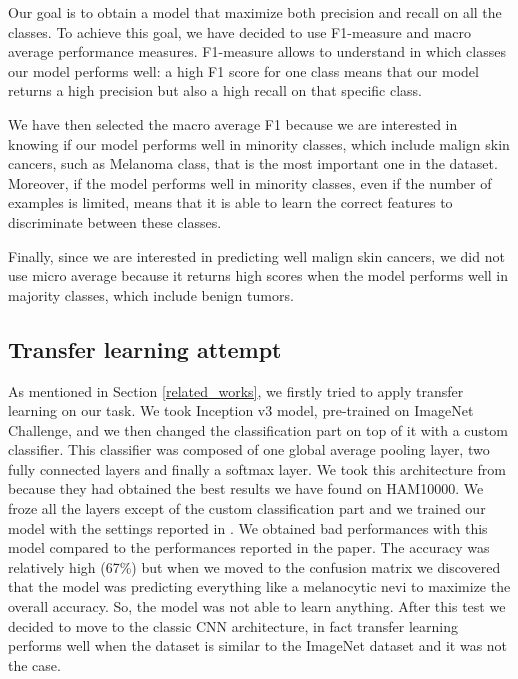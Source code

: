 		\smallskip
		
		Our goal is to obtain a model that maximize both precision and recall on all the classes.
		To achieve this goal, we have decided to use F1-measure and macro average performance measures. F1-measure allows to understand in which classes our model performs well: a high F1 score for one class means that our model returns a high precision but also a high recall on that specific class. 
		
		\smallskip
		
		We have then selected the macro average F1 because we are interested in knowing if our model performs well in minority classes, which include malign skin cancers, such as Melanoma class, that is the most important one in the dataset. 
		Moreover, if the model performs well in minority classes, even if the number of examples is limited, means that it is able to learn the correct features to discriminate between these classes. 
		
		\smallskip
		
		Finally, since we are interested in predicting well malign skin cancers, we did not use micro average because it returns high scores when the model performs well in majority classes, which include benign tumors.
		
	\subsection{Transfer learning attempt}
		
		As mentioned in Section \ref{related_works}, we firstly tried to apply transfer learning on our task. We took Inception v3 model, pre-trained on ImageNet Challenge, and we then changed the classification part on top of it with a custom classifier. This classifier was composed of one global average pooling layer, two fully connected layers and finally a softmax layer. We took this architecture from \cite{article2} because they had obtained the best results we have found on HAM10000. We froze all the layers except of the custom classification part and we trained our model with the settings reported in \cite{article2}. We obtained bad performances with this model compared to the performances reported in the paper. The accuracy was relatively high (67\%) but when we moved to the confusion matrix we discovered that the model was predicting everything like a melanocytic nevi to maximize the overall accuracy. So, the model was not able to learn anything. After this test we decided to move to the classic CNN architecture, in fact transfer learning performs well when the dataset is similar to the ImageNet dataset and it was not the case.
		

